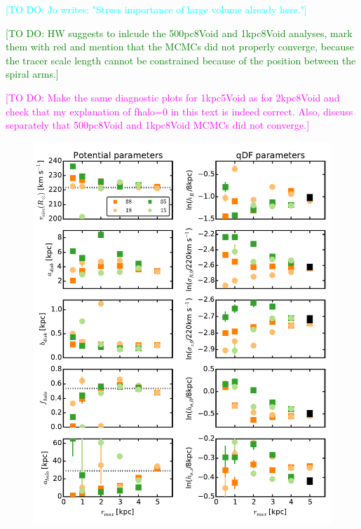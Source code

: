 \documentclass[iop,revtex4,numberedappendix,appendixfloats]{emulateapj}
\newcommand{\Wilma}[1]{\textcolor{Magenta}{#1}}
\newcommand{\HW}[1]{\textcolor{Green}{#1}}
\newcommand{\Jo}[1]{\textcolor{Cyan}{#1}}
\begin{document}
\Jo{[TO DO: Jo writes: "Stress importance of large volume already here."]}

\HW{[TO DO: HW suggests to inlcude the 500pc8Void and 1kpc8Void analyses, mark them with red and mention that the MCMCs did not properly converge, because the tracer scale length cannot be constrained because of the position between the spiral arms.]}

\Wilma{[TO DO: Make the same diagnostic plots for 1kpc5Void as for 2kpc8Void and check that my explanation of fhalo=0 in this text is indeed correct. Also, discuss separately that 500pc8Void and 1kpc8Void MCMCs did not converge.]}


\begin{figure}[!htbp]
\centering
\includegraphics[width=\columnwidth]{fig/MNdHHdiffSph2_violins.pdf}

\end{figure}
\end{document}
